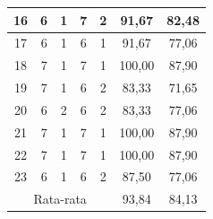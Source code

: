 \begin{table}[H]
\begin{tabular}{|ccccc|c|c|}
		\multicolumn{1}{|c|}{16}                                & \multicolumn{1}{c|}{6}                               & \multicolumn{1}{c|}{1}                               & \multicolumn{1}{c|}{7}                               & 2       & 91,67     & 82,48          \\ \hline
		\multicolumn{1}{|c|}{17}                                & \multicolumn{1}{c|}{6}                               & \multicolumn{1}{c|}{1}                               & \multicolumn{1}{c|}{6}                               & 1       & 91,67     & 77,06          \\ \hline
		\multicolumn{1}{|c|}{18}                                & \multicolumn{1}{c|}{7}                               & \multicolumn{1}{c|}{1}                               & \multicolumn{1}{c|}{7}                               & 1       & 100,00    & 87,90          \\ \hline
		\multicolumn{1}{|c|}{19}                                & \multicolumn{1}{c|}{7}                               & \multicolumn{1}{c|}{1}                               & \multicolumn{1}{c|}{6}                               & 2       & 83,33     & 71,65          \\ \hline
		\multicolumn{1}{|c|}{20}                                & \multicolumn{1}{c|}{6}                               & \multicolumn{1}{c|}{2}                               & \multicolumn{1}{c|}{6}                               & 2       & 83,33     & 77,06          \\ \hline
		\multicolumn{1}{|c|}{21}                                & \multicolumn{1}{c|}{7}                               & \multicolumn{1}{c|}{1}                               & \multicolumn{1}{c|}{7}                               & 1       & 100,00    & 87,90          \\ \hline
		\multicolumn{1}{|c|}{22}                                & \multicolumn{1}{c|}{7}                               & \multicolumn{1}{c|}{1}                               & \multicolumn{1}{c|}{7}                               & 1       & 100,00    & 87,90          \\ \hline
		\multicolumn{1}{|c|}{23}                                & \multicolumn{1}{c|}{6}                               & \multicolumn{1}{c|}{1}                               & \multicolumn{1}{c|}{6}                               & 2       & 87,50     & 77,06          \\ \hline
		\multicolumn{5}{|c|}{Rata-rata}                         & 93,84                                                & 84,13                                                                                                                                              \\ \hline
	\end{tabular}
\end{table}


